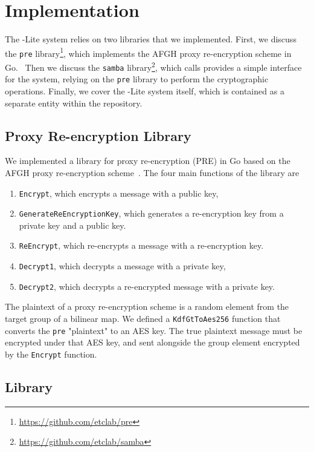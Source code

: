 \section{Implementation}
\label{sec:implementation}

The \SystemName-Lite system relies on two libraries that we implemented. First, we discuss the \texttt{pre} library\footnote{\url{https://github.com/etclab/pre}},
which implements the AFGH proxy re-encryption scheme in Go.~\cite{05-ndss-improved_proxy_reencryption}
Then we discuss the \texttt{samba} library\footnote{\url{https://github.com/etclab/samba}}, which calls provides a simple interface for the \SystemName system, relying on the \texttt{pre} library to perform the cryptographic operations.
Finally, we cover the \SystemName-Lite system itself, which is contained as a separate entity within the \SystemName repository.

\subsection{Proxy Re-encryption Library}
\label{sec:PRE}
%
We implemented a library for proxy re-encryption (PRE) in Go based on the AFGH proxy re-encryption scheme~\cite{05-ndss-improved_proxy_reencryption}.
The four main functions of the library are 
\begin{enumerate}
	\item \texttt{Encrypt}, which encrypts a message with a public key,
	\item \texttt{GenerateReEncryptionKey}, which generates a re-encryption key from a private key and a public key.
	\item \texttt{ReEncrypt}, which re-encrypts a message with a re-encryption key.
	\item \texttt{Decrypt1}, which decrypts a message with a private key,
	\item \texttt{Decrypt2}, which decrypts a re-encrypted message with a private key.
\end{enumerate}

The plaintext of a proxy re-encryption scheme is a random element from the target group of a bilinear map.
We defined a \texttt{KdfGtToAes256} function that converts the \texttt{pre} "plaintext" to an AES key.
The true plaintext message must be encrypted under that AES key, and sent alongside the group element encrypted by the \texttt{Encrypt} function.

\subsection{\SystemName Library}


